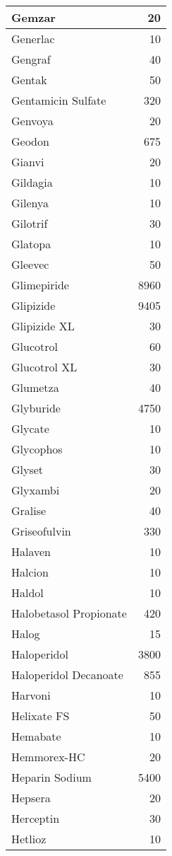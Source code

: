 \documentclass[
]{article}
\begin{document}
\begin{table}
\begin{tabular}[t]{l|r}
\hline
Gemzar & 20\\
\hline
Generlac & 10\\
\hline
Gengraf & 40\\
\hline
Gentak & 50\\
\hline
Gentamicin Sulfate & 320\\
\hline
Genvoya & 20\\
\hline
Geodon & 675\\
\hline
Gianvi & 20\\
\hline
Gildagia & 10\\
\hline
Gilenya & 10\\
\hline
Gilotrif & 30\\
\hline
Glatopa & 10\\
\hline
Gleevec & 50\\
\hline
Glimepiride & 8960\\
\hline
Glipizide & 9405\\
\hline
Glipizide XL & 30\\
\hline
Glucotrol & 60\\
\hline
Glucotrol XL & 30\\
\hline
Glumetza & 40\\
\hline
Glyburide & 4750\\
\hline
Glycate & 10\\
\hline
Glycophos & 10\\
\hline
Glyset & 30\\
\hline
Glyxambi & 20\\
\hline
Gralise & 40\\
\hline
Griseofulvin & 330\\
\hline
Halaven & 10\\
\hline
Halcion & 10\\
\hline
Haldol & 10\\
\hline
Halobetasol Propionate & 420\\
\hline
Halog & 15\\
\hline
Haloperidol & 3800\\
\hline
Haloperidol Decanoate & 855\\
\hline
Harvoni & 10\\
\hline
Helixate FS & 50\\
\hline
Hemabate & 10\\
\hline
Hemmorex-HC & 20\\
\hline
Heparin Sodium & 5400\\
\hline
Hepsera & 20\\
\hline
Herceptin & 30\\
\hline
Hetlioz & 10\\

\end{tabular}
\end{table}
\end{document}
